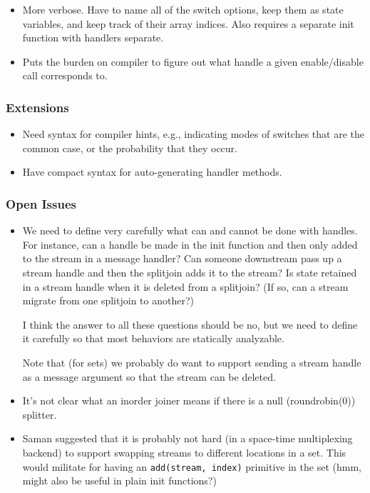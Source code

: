 \documentclass{tr}
\begin{document}

\begin{itemize}

\item More verbose.  Have to name all of the switch options, keep them
as state variables, and keep track of their array indices.  Also
requires a separate init function with handlers separate.

\item Puts the burden on compiler to figure out what handle a given
enable/disable call corresponds to.

\end{itemize}

\subsubsection {Extensions}

\begin{itemize}

\item Need syntax for compiler hints, e.g., indicating modes of
switches that are the common case, or the probability that they occur.

\item Have compact syntax for auto-generating handler methods.

\end{itemize}

\subsubsection {Open Issues}

\begin{itemize}

\item We need to define very carefully what can and cannot be done
with handles.  For instance, can a handle be made in the init function
and then only added to the stream in a message handler?  Can someone
downstream pass up a stream handle and then the splitjoin adds it to
the stream?  Is state retained in a stream handle when it is deleted
from a splitjoin?  (If so, can a stream migrate from one splitjoin to
another?)

I think the answer to all these questions should be no, but we need to
define it carefully so that most behaviors are statically analyzable.

Note that (for sets) we probably do want to support sending a stream
handle as a message argument so that the stream can be deleted.

\item It's not clear what an inorder joiner means if there is a null
(roundrobin(0)) splitter.

\item Saman suggested that it is probably not hard (in a space-time
multiplexing backend) to support swapping streams to different
locations in a set.  This would militate for having an
\verb+add(stream, index)+ primitive in the set (hmm, might also be
useful in plain init functions?)

\end{itemize}
\end{document}
